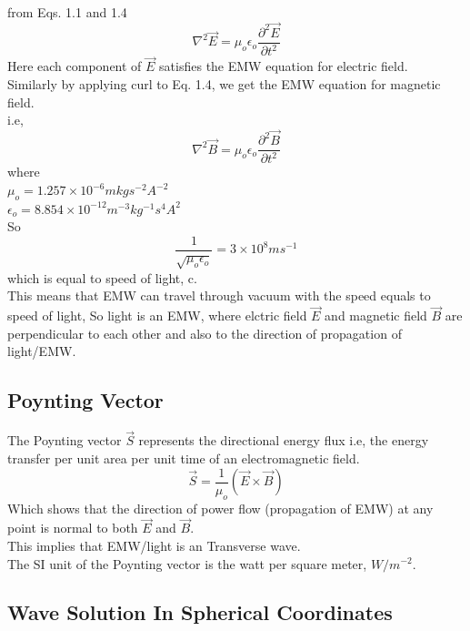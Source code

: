 from Eqs. 1.1 and 1.4\\
\begin{equation}
\nabla^2\vec{E} =  \mu_{o}\epsilon_{o}\frac{\partial^2\vec{E}}{\partial t^2}
\end{equation}
Here each component of $\vec{E}$ satisfies the EMW equation for electric field.\\ 
Similarly by applying curl to Eq. 1.4, we get the EMW equation for magnetic field.\\
i.e,\\
\begin{equation}
\nabla^2\vec{B} =  \mu_{o}\epsilon_{o}\frac{\partial^2\vec{B}}{\partial t^2}
\end{equation}
where \\
$\mu_{o} = 1.257\times10^{-6} mkgs^{-2}A^{-2}$\\
$\epsilon_{o} = 8.854\times10^{-12} m^{-3}kg^{-1}s^4A^2$\\
So\\
\begin{equation}
\frac{1}{\sqrt{\mu_{o}\epsilon_{o}}} = 3\times10^8 ms^{-1}
\end{equation}
which is equal to speed of light, c.\\
This means that EMW can travel through vacuum with the speed equals to speed of light, So light is an EMW, where elctric field $\vec{E}$ and magnetic field $\vec{B}$ are perpendicular to each other and also to the direction of propagation of light/EMW.

\subsection{Poynting Vector}
The Poynting vector $\vec{S}$ represents the directional energy flux i.e, the energy transfer per unit area per unit time of an electromagnetic field.\\
\begin{equation}
\vec{S} = \frac{1}{\mu_{o}}(\vec{E}\times\vec{B})
\end{equation}
Which shows that the direction of power flow (propagation of EMW) at any point is normal to both $\vec{E}$ and $\vec{B}$.\\
This implies that EMW/light is an Transverse wave.\\
The SI unit of the Poynting vector is the watt per square meter, $W/m^{-2}$.

\subsection{Wave Solution In Spherical Coordinates}


